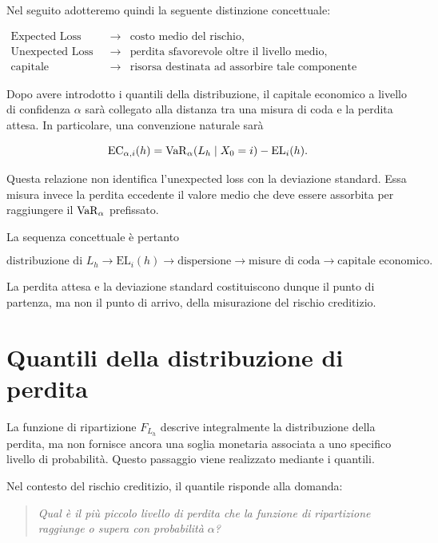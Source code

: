 Nel seguito adotteremo quindi la seguente distinzione concettuale:

\[
\begin{array}{lll}
\text{Expected Loss}
&
\longrightarrow
&
\text{costo medio del rischio,}
\\[1mm]
\text{Unexpected Loss}
&
\longrightarrow
&
\text{perdita sfavorevole oltre il livello medio,}
\\[1mm]
\text{capitale economico}
&
\longrightarrow
&
\text{risorsa destinata ad assorbire tale componente sfavorevole.}
\end{array}
\]

Dopo avere introdotto i quantili della distribuzione, il capitale
economico a livello di confidenza $\alpha$ sar\`{a} collegato alla
distanza tra una misura di coda e la perdita attesa. In particolare,
una convenzione naturale sar\`{a}

\[
\mathrm{EC}_{\alpha,i}(h)
=
\operatorname{VaR}_{\alpha}(L_h\mid X_0=i)
-
\mathrm{EL}_i(h).
\]

Questa relazione non identifica l'unexpected loss con la deviazione
standard. Essa misura invece la perdita eccedente il valore medio che
deve essere assorbita per raggiungere il $\operatorname{VaR}_\alpha$ prefissato.

La sequenza concettuale \`{e} pertanto

\[
\text{distribuzione di }L_h
\longrightarrow
\mathrm{EL}_i(h)
\longrightarrow
\text{dispersione}
\longrightarrow
\text{misure di coda}
\longrightarrow
\text{capitale economico}.
\]

La perdita attesa e la deviazione standard costituiscono dunque il
punto di partenza, ma non il punto di arrivo, della misurazione del
rischio creditizio.

\section{Quantili della distribuzione di perdita}

\label{sec:cap9-quantili-perdita}

La funzione di ripartizione $F_{L_h}$ descrive integralmente la
distribuzione della perdita, ma non fornisce ancora una soglia monetaria
associata a uno specifico livello di probabilit\`{a}. Questo passaggio
viene realizzato mediante i quantili.

Nel contesto del rischio creditizio, il quantile risponde alla domanda:

\begin{quote}
\emph{Qual \`{e} il pi\`{u} piccolo livello di perdita che la funzione
di ripartizione raggiunge o supera con probabilit\`{a} $\alpha$?}
\end{quote}


